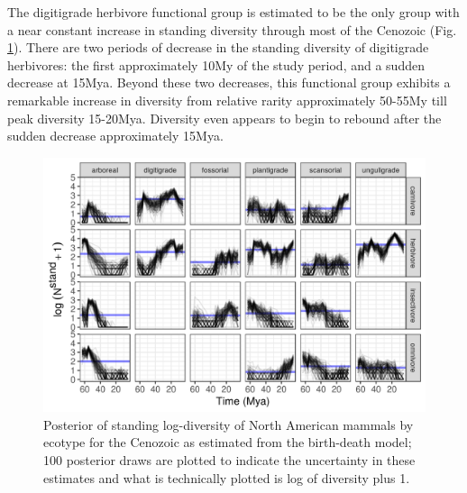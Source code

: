 \documentclass[12pt,letterpaper]{article}
\begin{document}
The digitigrade herbivore functional group is estimated to be the only group with a near constant increase in standing diversity through most of the Cenozoic (Fig. \ref{fig:ecotype_diversity}). There are two periods of decrease in the standing diversity of digitigrade herbivores: the first approximately 10My of the study period, and a sudden decrease at 15Mya. Beyond these two decreases, this functional group exhibits a remarkable increase in diversity from relative rarity approximately 50-55My till peak diversity 15-20Mya. Diversity even appears to begin to rebound after the sudden decrease approximately 15Mya.
\begin{figure}[ht]
  \centering
  \includegraphics[width=\textwidth,height=0.5\textheight,keepaspectratio=true]{figure/ecotype_diversity}
  \caption[Estimated mammal ecotype log-diversity for the Cenozoic]{Posterior of standing log-diversity of North American mammals by ecotype for the Cenozoic as estimated from the birth-death model; 100 posterior draws are plotted to indicate the uncertainty in these estimates and what is technically plotted is log of diversity plus 1.}
  \label{fig:ecotype_diversity}
\end{figure}
\end{document}
